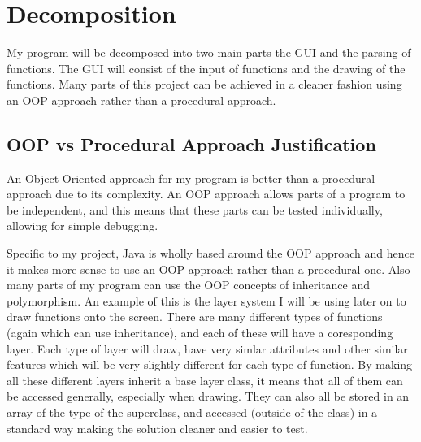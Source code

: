 \documentclass[../../../../main.tex]{subfiles}
\begin{document}
\section{Decomposition}
My program will be decomposed into two main parts the GUI and the parsing of functions. The GUI will consist of the input of functions and the drawing of the functions. Many parts of this project can be achieved in a cleaner fashion using an OOP approach rather than a procedural approach.
\subsection{OOP vs Procedural Approach Justification}
An Object Oriented approach for my program is better than a procedural approach due to its complexity. An OOP approach allows parts of a program to be independent, and this means that these parts can be tested individually, allowing for simple debugging. 

Specific to my project, Java is wholly based around the OOP approach and hence it makes more sense to use an OOP approach rather than a procedural one. Also many parts of my program can use the OOP concepts of inheritance and polymorphism. An example of this is the layer system I will be using later on to draw functions onto the screen. There are many different types of functions (again which can use inheritance), and each of these will have a coresponding layer. Each type of layer will draw, have very simlar attributes and other similar features which will be very slightly different for each type of function. By making all these different layers inherit a base layer class, it means that all of them can be accessed generally, especially when drawing. They can also all be stored in an array of the type of the superclass, and accessed (outside of the class) in a standard way making the solution cleaner and easier to test.
\newpage
\end{document}
